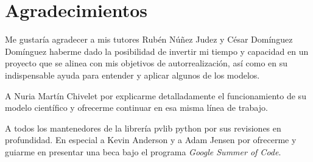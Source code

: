 \chapter*{Agradecimientos} \label{chp:agrad}

Me gustaría agradecer a mis tutores Rubén Núñez Judez y César Domínguez Domínguez haberme dado la posibilidad de invertir mi tiempo y capacidad en un proyecto que se alinea con mis objetivos de autorrealización, así como en su indispensable ayuda para entender y aplicar algunos de los modelos.

A Nuria Martín Chivelet por explicarme detalladamente el funcionamiento de su modelo científico y ofrecerme continuar en esa misma línea de trabajo.

A todos los mantenedores de la librería pvlib python por sus revisiones en profundidad. En especial a Kevin Anderson y a Adam Jensen por ofrecerme y guiarme en presentar una beca bajo el programa \textit{Google Summer of Code}.
